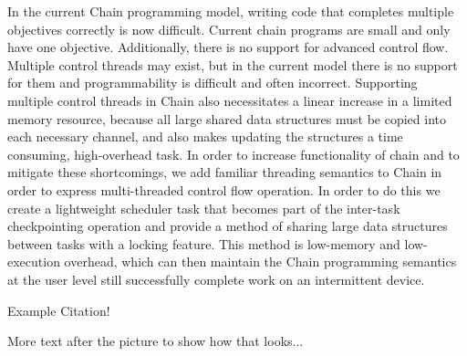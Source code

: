 \documentclass[11pt]{sensys-proc}
\begin{document}
In the current Chain programming model, writing code that completes multiple objectives correctly is now difficult.
Current chain programs are small and only have one objective. Additionally, there is no support for advanced control flow.
Multiple control threads may exist, but in the current model there is no support for them and programmability is difficult and often incorrect.
Supporting multiple control threads in Chain also necessitates a linear increase in a limited memory resource, because all large shared data structures
must be copied into each necessary channel, and also makes updating the structures a time consuming, high-overhead task.
In order to increase functionality of chain and to mitigate these shortcomings, we add familiar threading semantics to Chain in order to express
multi-threaded control flow operation. In order to do this we create a lightweight scheduler task that becomes part of the inter-task checkpointing
operation and provide a method of sharing large data structures between tasks with a locking feature. This method is low-memory and low-execution
overhead, which can then maintain the Chain programming semantics at the user level still successfully complete work on an intermittent device.

Example Citation\cite{Chain, Mementos, Aware, Dino}!




More text after the picture to show how that looks...
\end{document}
